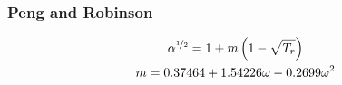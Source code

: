 \subsubsection{Peng and Robinson \cite{pengRobinson}}


\begin{gather}
	\alpha^{\nicefrac{1}{2}} = 1 + m \left(1-\sqrt{T_r}\right)\\
	m = 0.37464+1.54226\omega-0.2699\omega^2
\end{gather}